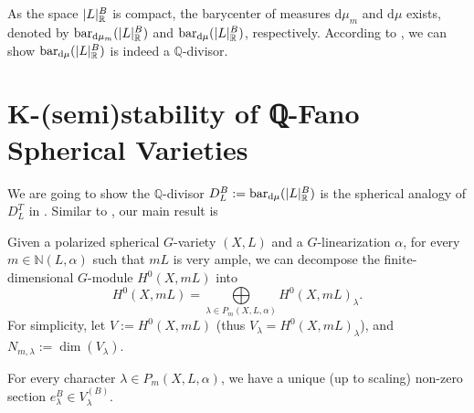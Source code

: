 \documentclass[11pt, oneside]{amsart}
\makeatletter
\newtheorem{theorem}{Theorem}[section]
\let\over\@@over
\newcommand{\<}{\left\langle} \renewcommand{\>}{\right\rangle}
\let\oldbigoplus\bigoplus
\renewcommand{\bigoplus}{\oldbigoplus\limits}
\let\oldinf\inf
\renewcommand{\inf}{\oldinf\limits}
\newcommand{\dd}{\mathrm{d}}
\makeatother
\begin{document}
As the space $\mathopen{}\left|L\right|\mathclose{}_\mathbb{R}^B$ is compact, the barycenter of measures $\dd \mu_m$ and $\dd \mu$ exists, denoted by $\bc_{\dd \mu_m}(\Rls{L}^B)$ and $\bc_{\dd \mu}(\Rls{L}^B)$, respectively. According to \cite[\S4.1]{Brion_grp_Pic_num_char_sph}, we can show $\bc_{\dd \mu}(\Rls{L}^B)$ is indeed a $\mathbb{Q}$-divisor.





\section{K-(semi)stability of ℚ-Fano Spherical Varieties}\label{sec:KstSph}




We are going to show the $\mathbb{Q}$-divisor $D^B_L := \bc_{\dd \mu}(\Rls{L}^B)$ is the spherical analogy of $D^T_L$ in . Similar to , our main result is

Given a polarized spherical $G$-variety $(X, L)$ and a $G$-linearization $\alpha$, for every $m \in \mathbb{N}(L, \alpha)$ such that $m L$ is very ample, we can decompose the finite-dimensional $G$-module $H^0(X, m L)$ into
\begin{equation}\label{eq:decompSph}
	H^0(X, m L) = \bigoplus_{\lambda \in P_m(X, L, \alpha)} H^0(X, m L)_\lambda .
\end{equation}
For simplicity, let $V := H^0(X, m L)$ (thus $V_\lambda = H^0(X, m L)_\lambda$), and $N_{m, \lambda} := \dim(V_\lambda)$.

For every character $\lambda \in P_m(X, L, \alpha)$, we have a unique (up to scaling) non-zero section $e^B_\lambda \in V^{(B)}_\lambda$.
\end{document}
